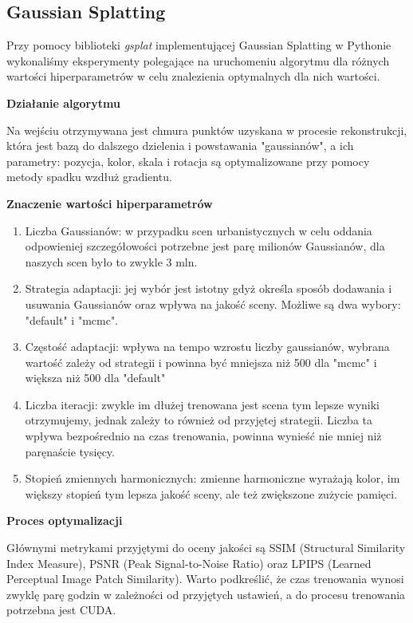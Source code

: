 \subsection{Gaussian Splatting}
Przy pomocy biblioteki \textit{gsplat}\cite{ye2024gsplatopensourcelibrarygaussian} implementującej Gaussian Splatting w Pythonie wykonaliśmy eksperymenty polegające na uruchomeniu algorytmu dla różnych wartości hiperparametrów w celu znalezienia optymalnych dla nich wartości. 

\textbf{Działanie algorytmu}

Na wejściu otrzymywana jest chmura punktów uzyskana w procesie rekonstrukcji, która jest bazą do dalszego dzielenia i powstawania "gaussianów", a ich parametry: pozycja, kolor, skala i rotacja są optymalizowane przy pomocy metody spadku wzdłuż gradientu. 


\textbf{Znaczenie wartości hiperparametrów}
\begin{enumerate}
    \item Liczba Gaussianów: w przypadku scen urbanistycznych w celu oddania odpowieniej szczegółowości potrzebne jest parę milionów Gaussianów, dla naszych scen było to zwykle 3 mln.
    \item Strategia adaptacji: jej wybór jest istotny gdyż określa sposób dodawania i usuwania Gaussianów oraz wpływa na jakość sceny. Możliwe są dwa wybory: "default" i "mcmc".
    \item Częstość adaptacji: wpływa na tempo wzrostu liczby gaussianów, wybrana wartość zależy od strategii i powinna być mniejsza niż 500 dla "mcmc" i większa niż 500 dla "default"
    \item Liczba iteracji: zwykle im dłużej trenowana jest scena tym lepsze wyniki otrzymujemy, jednak zależy to również od przyjętej strategii. Liczba ta wpływa bezpośrednio na czas trenowania, powinna wynieść nie mniej niż paręnaście tysięcy.
    \item Stopień zmiennych harmonicznych: zmienne harmoniczne wyrażają kolor, im większy stopień tym lepsza jakość sceny, ale też zwiększone zużycie pamięci.  
\end{enumerate}

\textbf{Proces optymalizacji}

Głównymi metrykami przyjętymi do oceny jakości są SSIM (Structural Similarity Index Measure), PSNR (Peak Signal-to-Noise Ratio) oraz LPIPS (Learned Perceptual Image Patch Similarity). Warto podkreślić, że czas trenowania wynosi zwyklę parę godzin w zależności od przyjętych ustawień, a do procesu trenowania potrzebna jest CUDA. 

